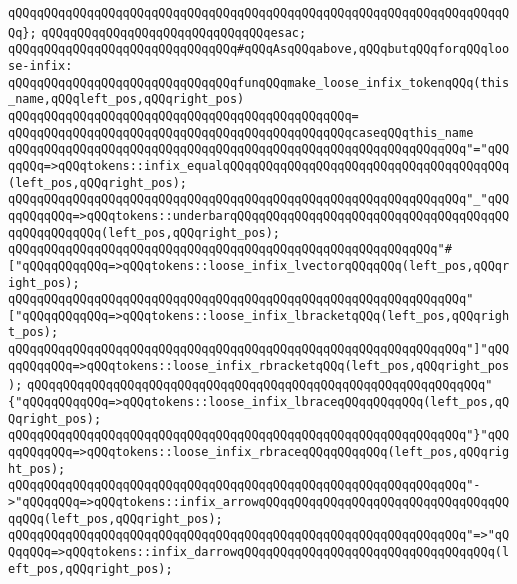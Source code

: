 \verb|qQQqqQQqqQQqqQQqqQQqqQQqqQQqqQQqqQQqqQQqqQQqqQQqqQQqqQQqqQQqqQQqqQQqqQQq};|\newline
\verb|qQQqqQQqqQQqqQQqqQQqqQQqqQQqqQQqesac;|\newline
\newline
\verb|qQQqqQQqqQQqqQQqqQQqqQQqqQQqqQQq#qQQqAsqQQqabove,qQQqbutqQQqforqQQqloose-infix:|\newline
\newline
\verb|qQQqqQQqqQQqqQQqqQQqqQQqqQQqqQQqfunqQQqmake_loose_infix_tokenqQQq(this_name,qQQqleft_pos,qQQqright_pos)|\newline
\verb|qQQqqQQqqQQqqQQqqQQqqQQqqQQqqQQqqQQqqQQqqQQqqQQq=|\newline
\verb|qQQqqQQqqQQqqQQqqQQqqQQqqQQqqQQqqQQqqQQqqQQqqQQqcaseqQQqthis_name|\newline
\verb|qQQqqQQqqQQqqQQqqQQqqQQqqQQqqQQqqQQqqQQqqQQqqQQqqQQqqQQqqQQqqQQq"="qQQqqQQq=>qQQqtokens::infix_equalqQQqqQQqqQQqqQQqqQQqqQQqqQQqqQQqqQQqqQQq(left_pos,qQQqright_pos);|\newline
\verb|qQQqqQQqqQQqqQQqqQQqqQQqqQQqqQQqqQQqqQQqqQQqqQQqqQQqqQQqqQQqqQQq"_"qQQqqQQqqQQq=>qQQqtokens::underbarqQQqqQQqqQQqqQQqqQQqqQQqqQQqqQQqqQQqqQQqqQQqqQQqqQQq(left_pos,qQQqright_pos);|\newline
\verb|qQQqqQQqqQQqqQQqqQQqqQQqqQQqqQQqqQQqqQQqqQQqqQQqqQQqqQQqqQQq"#["qQQqqQQqqQQq=>qQQqtokens::loose_infix_lvectorqQQqqQQq(left_pos,qQQqright_pos);|\newline
\verb|qQQqqQQqqQQqqQQqqQQqqQQqqQQqqQQqqQQqqQQqqQQqqQQqqQQqqQQqqQQqqQQq"["qQQqqQQqqQQq=>qQQqtokens::loose_infix_lbracketqQQq(left_pos,qQQqright_pos);|\newline
\verb|qQQqqQQqqQQqqQQqqQQqqQQqqQQqqQQqqQQqqQQqqQQqqQQqqQQqqQQqqQQqqQQq"]"qQQqqQQqqQQq=>qQQqtokens::loose_infix_rbracketqQQq(left_pos,qQQqright_pos);|\newline
\verb|qQQqqQQqqQQqqQQqqQQqqQQqqQQqqQQqqQQqqQQqqQQqqQQqqQQqqQQqqQQqqQQq"{"qQQqqQQqqQQq=>qQQqtokens::loose_infix_lbraceqQQqqQQqqQQq(left_pos,qQQqright_pos);|\newline
\verb|qQQqqQQqqQQqqQQqqQQqqQQqqQQqqQQqqQQqqQQqqQQqqQQqqQQqqQQqqQQqqQQq"}"qQQqqQQqqQQq=>qQQqtokens::loose_infix_rbraceqQQqqQQqqQQq(left_pos,qQQqright_pos);|\newline
\verb|qQQqqQQqqQQqqQQqqQQqqQQqqQQqqQQqqQQqqQQqqQQqqQQqqQQqqQQqqQQqqQQq"->"qQQqqQQq=>qQQqtokens::infix_arrowqQQqqQQqqQQqqQQqqQQqqQQqqQQqqQQqqQQqqQQq(left_pos,qQQqright_pos);|\newline
\verb|qQQqqQQqqQQqqQQqqQQqqQQqqQQqqQQqqQQqqQQqqQQqqQQqqQQqqQQqqQQqqQQq"=>"qQQqqQQq=>qQQqtokens::infix_darrowqQQqqQQqqQQqqQQqqQQqqQQqqQQqqQQqqQQq(left_pos,qQQqright_pos);|\newline
